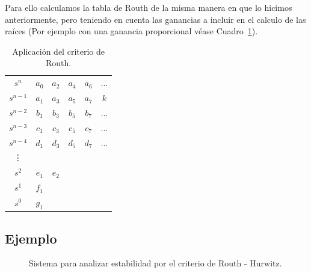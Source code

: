         Para ello calculamos la tabla de Routh de la misma manera en que lo hicimos anteriormente, pero teniendo en cuenta las ganancias a incluir en el calculo de las raíces (Por ejemplo con una ganancia proporcional véase Cuadro~\ref{tab:Aplicacion}).

        \begin{table}[htbp]
            \centering
            \begin{tabular}{c|c c c c c}
            $s^n$     & $a_0$ & $a_2$ & $a_4$ & $a_6$ & ...\\
            $s^{n-1}$ & $a_1$ & $a_3$ & $a_5$ & $a_7$ & $k$\\
            $s^{n-2}$ & $b_1$ & $b_3$ & $b_5$ & $b_7$ & ...\\
            $s^{n-3}$ & $c_1$ & $c_3$ & $c_5$ & $c_7$ & ...\\
            $s^{n-4}$ & $d_1$ & $d_3$ & $d_5$ & $d_7$ & ...\\
            \vdots                                         \\
            $s^2$ & $e_1$ & $e_2$                          \\
            $s^1$ & $f_1$                                  \\
            $s^0$ & $g_1$
            \end{tabular}
            \caption{\label{tab:Aplicacion}Aplicación del criterio de Routh.}
        \end{table}


        \subsection{Ejemplo}

            \begin{figure}
                \centering
                \caption{\label{dia:est1}Sistema para analizar estabilidad por el criterio de Routh - Hurwitz.}
            \end{figure}

